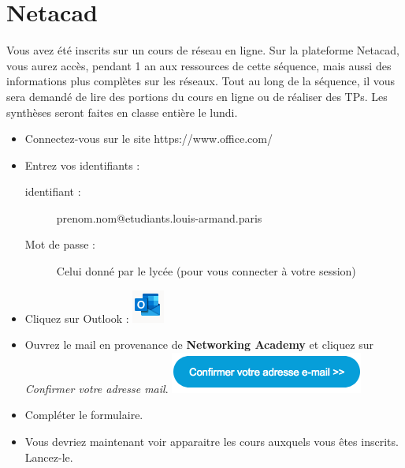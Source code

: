 \documentclass[11pt]{article}
\begin{document}
\UPSTIbuildPage


\section{Netacad}
Vous avez été inscrits sur un cours de réseau en ligne. Sur la plateforme Netacad, vous aurez accès, pendant 1 an aux ressources de cette séquence, mais aussi des informations plus complètes sur les réseaux.
Tout au long de la séquence, il vous sera demandé de lire des portions du cours en ligne ou de réaliser des TPs. Les synthèses seront faites en classe entière le lundi.


\begin{UPSTIactivite}
	\begin{itemize}
		\item Connectez-vous sur le site https://www.office.com/
		\item Entrez vos identifiants :
		\begin{description}
			\item [identifiant : ] prenom.nom@etudiants.louis-armand.paris
			\item [Mot de passe : ] Celui donné par le lycée (pour vous connecter à votre session)
		\end{description}
		\item Cliquez sur Outlook : \includegraphics[height=.5cm]{Src/Images/outlook}
		\item Ouvrez le mail en provenance de \textbf{Networking Academy} et cliquez sur \textit{Confirmer votre adresse mail}.
		\includegraphics[height=.7cm]{Src/Images/confirmationmail}
		\item Compléter le formulaire.
		\item Vous devriez maintenant voir apparaitre les cours auxquels vous êtes inscrits. Lancez-le.
	\end{itemize}
\end{UPSTIactivite}
\end{document}
